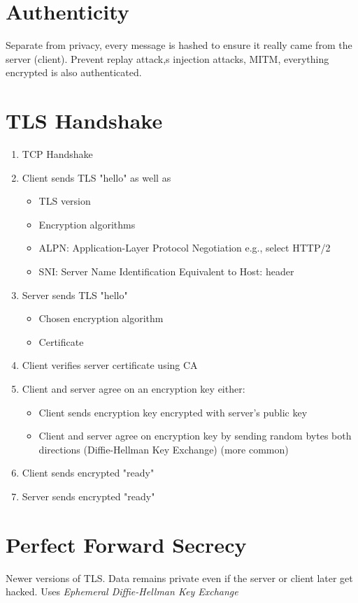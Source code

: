 \documentclass[../CMPUT-404-Notes.tex]{subfiles}
\begin{document}
\section{Authenticity}
Separate from privacy, every message is hashed to ensure it really came from the server (client).
Prevent replay attack,s injection attacks, MITM, everything encrypted is also authenticated.

\section{TLS Handshake}
\begin{enumerate}
  \item TCP Handshake
  \item Client sends TLS "hello" as well as 
  \begin{itemize}
    \item TLS version
    \item Encryption algorithms
    \item ALPN: Application-Layer Protocol Negotiation e.g., select HTTP/2
    \item SNI: Server Name Identification Equivalent to Host: header
  \end{itemize}
  \item Server sends TLS "hello"
  \begin{itemize}
    \item Chosen encryption algorithm
    \item Certificate
  \end{itemize}
  \item Client verifies server certificate using CA
  \item Client and server agree on an encryption key either:
  \begin{itemize}
    \item Client sends encryption key encrypted with server's public key
    \item Client and server agree on encryption key by sending random bytes both directions (Diffie-Hellman Key Exchange) (more common)
  \end{itemize}
  \item Client sends encrypted "ready"
  \item Server sends encrypted "ready"
\end{enumerate}

\section{Perfect Forward Secrecy}
Newer versions of TLS. Data remains private even if the server or client later get hacked.
Uses \emph{Ephemeral Diffie-Hellman Key Exchange} 
\end{document}
